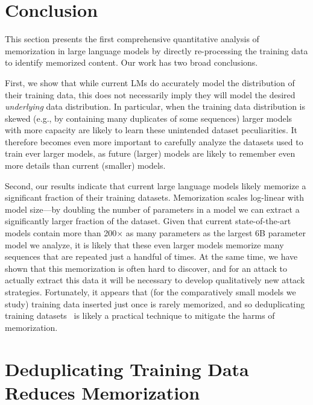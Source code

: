 \section{Conclusion}

%
This section presents the first comprehensive quantitative analysis of memorization in
large language models by directly re-processing the training data to identify memorized content.
%
Our work has two broad conclusions.

First, we show that while current LMs do accurately model the distribution of their training data, this does not necessarily imply they will model the desired \emph{underlying} data distribution.
In particular, when the training data distribution is skewed (e.g., by containing many duplicates of some sequences) larger models with more capacity are likely to learn these unintended dataset peculiarities.
%
It therefore becomes even more important to carefully analyze the datasets used to train ever larger models, as future (larger) models are likely to remember even more details than current (smaller) models.


Second, our results indicate that current large language models likely memorize a significant fraction of their training datasets.
%
Memorization scales log-linear with model size---by doubling the number of parameters in a model we can extract a significantly larger fraction of the dataset.
%
Given that current state-of-the-art models contain more than 200$\times$ as many parameters as the largest 6B parameter model we analyze, it is likely that these even larger models memorize many sequences that are repeated just a handful of times.
%
At the same time, we have shown that this memorization is often hard to discover, and for an attack to actually extract this data it will be necessary to develop qualitatively new attack strategies.
%
Fortunately, it appears that (for the comparatively small models we study) training data inserted just once is rarely memorized, and so deduplicating training datasets~\citep{2021dedup} is likely a practical technique to mitigate the harms of memorization.


\section{Deduplicating Training Data Reduces Memorization}

